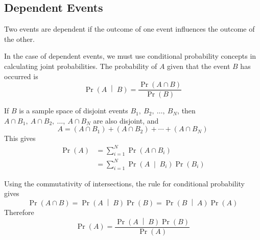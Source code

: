 \documentclass{article}
\begin{document}
\subsection{Dependent Events}
Two events are dependent if the outcome of one event influences the outcome of the other.
\begin{definition}
    In the case of dependent events, we must use \linebreak conditional probability concepts in calculating
    joint probabilities.
    The probability of $A$ given that the event $B$ has occurred is
    \begin{equation*}
        \Pr{\left( A \;\middle|\; B \right)} = \frac{\Pr{\left( A \cap B \right)}}{\Pr{\left( B \right)}}
    \end{equation*}
\end{definition}
\begin{theorem}
    If $B$ is a sample space of disjoint events $B_1,\: B_2,\: \dots,\: B_N$, then
    $A \cap B_1,\: A \cap B_2,\: \dots,\: A \cap B_N$ are also disjoint, and
    \begin{equation*}
        A = \left( A \cap B_1 \right) + \left( A \cap B_2 \right) + \cdots + \left( A \cap B_N \right)
    \end{equation*}
    This gives
    \begin{align*}
        \Pr{\left( A \right)} & = \sum_{i=1}^N \Pr{\left( A \cap B_i \right)}                                 \\
                              & = \sum_{i=1}^N \Pr{\left( A \;\middle|\; B_i \right)} \Pr{\left( B_i \right)}
    \end{align*}
\end{theorem}
\begin{theorem}
    Using the commutativity of intersections, the rule for conditional probability gives
    \begin{equation*}
        \Pr{\left( A \cap B \right)} = \Pr{\left( A \;\middle|\; B \right)} \Pr{\left( B \right)} = \Pr{\left( B \;\middle|\; A \right)} \Pr{\left( A \right)}
    \end{equation*}
    Therefore
    \begin{equation*}
        \Pr{\left( A \right)} = \frac{\Pr{\left( A \;\middle|\; B \right)} \Pr{\left( B \right)}}{\Pr{\left( A \right)}}
    \end{equation*}
\end{theorem}
\end{document}
